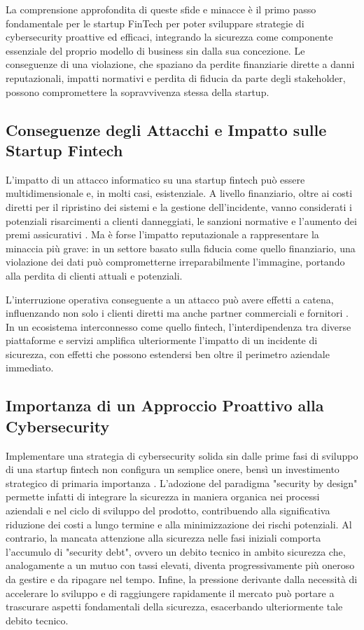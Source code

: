 La comprensione approfondita di queste sfide e minacce è il primo passo fondamentale per le startup FinTech per poter sviluppare strategie di cybersecurity proattive ed efficaci, integrando la sicurezza come componente essenziale del proprio modello di business sin dalla sua concezione. Le conseguenze di una violazione, che spaziano da perdite finanziarie dirette a danni reputazionali, impatti normativi e perdita di fiducia da parte degli stakeholder, possono compromettere la sopravvivenza stessa della startup.


\subsection{Conseguenze degli Attacchi e Impatto sulle Startup Fintech}

L'impatto di un attacco informatico su una startup fintech può essere multidimensionale e, in molti casi, esistenziale. A livello finanziario, oltre ai costi diretti per il ripristino dei sistemi e la gestione dell'incidente, vanno considerati i potenziali risarcimenti a clienti danneggiati, le sanzioni normative e l'aumento dei premi assicurativi \cite{fintechChallenges}. Ma è forse l'impatto reputazionale a rappresentare la minaccia più grave: in un settore basato sulla fiducia come quello finanziario, una violazione dei dati può comprometterne irreparabilmente l'immagine, portando alla perdita di clienti attuali e potenziali.

L'interruzione operativa conseguente a un attacco può avere effetti a catena, influenzando non solo i clienti diretti ma anche partner commerciali e fornitori \cite{fintechChallenges}. In un ecosistema interconnesso come quello fintech, l'interdipendenza tra diverse piattaforme e servizi amplifica ulteriormente l'impatto di un incidente di sicurezza, con effetti che possono estendersi ben oltre il perimetro aziendale immediato.

\subsection{Importanza di un Approccio Proattivo alla Cybersecurity}

Implementare una strategia di cybersecurity solida sin dalle prime fasi di sviluppo di una startup fintech non configura un semplice onere, bensì un investimento strategico di primaria importanza \cite{fintechChallenges}. L'adozione del paradigma "security by design" permette infatti di integrare la sicurezza in maniera organica nei processi aziendali e nel ciclo di sviluppo del prodotto, contribuendo alla significativa riduzione dei costi a lungo termine e alla minimizzazione dei rischi potenziali. Al contrario, la mancata attenzione alla sicurezza nelle fasi iniziali comporta l'accumulo di "security debt", ovvero un debito tecnico in ambito sicurezza che, analogamente a un mutuo con tassi elevati, diventa progressivamente più oneroso da gestire e da ripagare nel tempo. Infine, la pressione derivante dalla necessità di accelerare lo sviluppo e di raggiungere rapidamente il mercato può portare a trascurare aspetti fondamentali della sicurezza, esacerbando ulteriormente tale debito tecnico.

